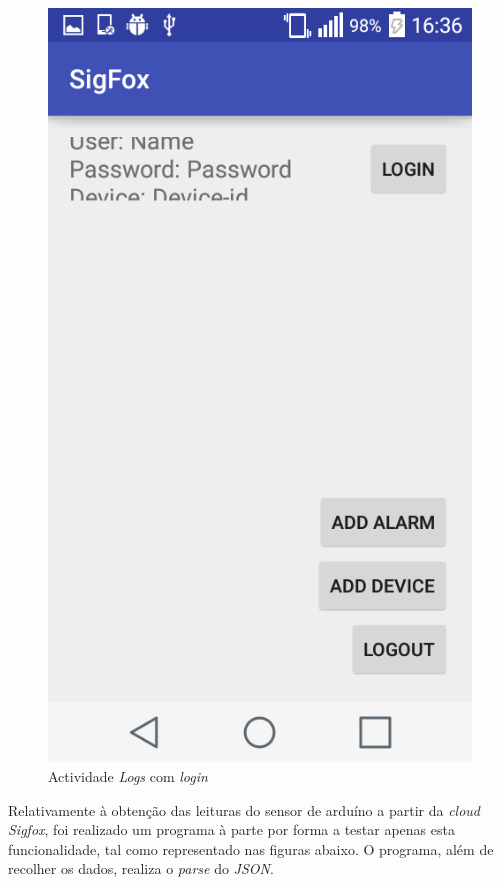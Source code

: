 \documentclass[a4paper]{article}
\begin{document}
\begin{figure}[H]
  \includegraphics[width=\linewidth]{login.png}
  \caption{Actividade \textit{Logs} com \textit{login}}\label{fig:login}
\endminipage
\end{figure}

Relativamente à obtenção das leituras do sensor de arduíno a partir da \textit{cloud Sigfox}, foi realizado um programa à parte por forma a testar apenas esta funcionalidade, tal como representado nas figuras abaixo. O programa, além de recolher os dados, realiza o \textit{parse} do \textit{JSON}.
\end{document}
